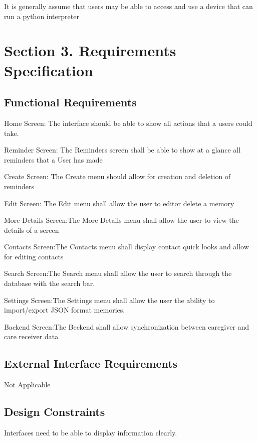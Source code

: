 \documentclass[
]{article}
\begin{document}
It is generally assume that users may be able to access and use a device
that can run a python interpreter

\section{Section 3. Requirements
Specification}\label{section-3.-requirements-specification}

\subsection{Functional Requirements}\label{functional-requirements}

Home Screen: The interface should be able to show all actions that a
users could take.

Reminder Screen: The Reminders screen shall be able to show at a glance
all reminders that a User has made

Create Screen: The Create menu should allow for creation and deletion of
reminders

Edit Screen: The Edit menu shall allow the user to editor delete a
memory

More Details Screen:The More Details menu shall allow the user to view
the details of a screen

Contacts Screen:The Contacts menu shall display contact quick looks and
allow for editing contacts

Search Screen:The Search menu shall allow the user to search through the
database with the search bar.

Settings Screen:The Settings menu shall allow the user the ability to
import/export JSON format memories.

Backend Screen:The Beckend shall allow synchronization between caregiver
and care receiver data

\subsection{External Interface
Requirements}\label{external-interface-requirements}

Not Applicable

\subsection{Design Constraints}\label{design-constraints}

Interfaces need to be able to display information clearly.
\end{document}

